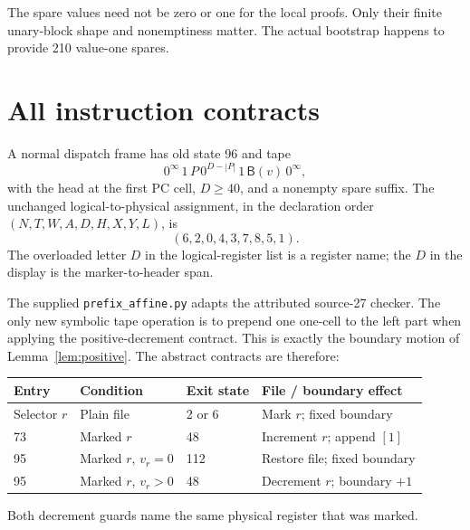 \documentclass[11pt]{article}
\newcommand{\B}{\mathsf B}
\begin{document}
The spare values need not be zero or one for the local proofs.  Only
their finite unary-block shape and nonemptiness matter.  The actual
bootstrap happens to provide 210 value-one spares.

\section{All instruction contracts}

A normal dispatch frame has old state 96 and tape
\[
0^\infty\,1\,P\,0^{D-|P|}\,1\,\B(v)\,0^\infty,
\]
with the head at the first PC cell, $D\ge40$, and a nonempty spare suffix.
The unchanged logical-to-physical assignment, in the declaration order
$(N,T,W,A,D,H,X,Y,L)$, is
\[
(6,2,0,4,3,7,8,5,1).
\]
The overloaded letter $D$ in the logical-register list is a register
name; the $D$ in the display is the marker-to-header span.

The supplied \texttt{prefix\_affine.py} adapts the attributed source-27
checker.  The only new symbolic tape operation is to prepend one
one-cell to the left part when applying the positive-decrement
contract.  This is exactly the boundary motion of
Lemma~\ref{lem:positive}.  The abstract contracts are therefore:
\begin{center}
\begin{tabular}{llll}
\toprule
Entry & Condition & Exit state & File / boundary effect\\
\midrule
Selector $r$ & Plain file & 2 or 6 & Mark $r$; fixed boundary\\
73 & Marked $r$ & 48 & Increment $r$; append $[1]$\\
95 & Marked $r$, $v_r=0$ & 112 & Restore file; fixed boundary\\
95 & Marked $r$, $v_r>0$ & 48 & Decrement $r$; boundary $+1$\\
\bottomrule
\end{tabular}
\end{center}
Both decrement guards name the same physical register that was marked.
\end{document}

